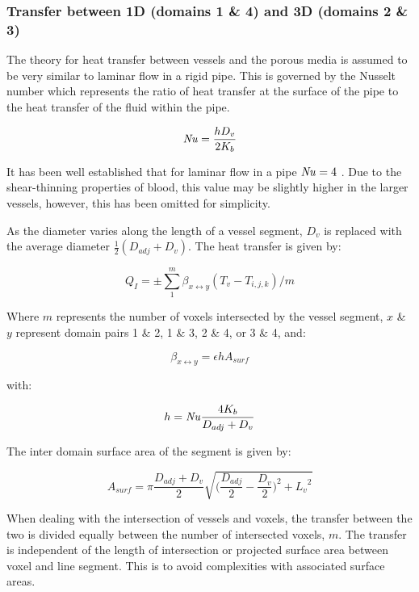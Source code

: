 \documentclass[11pt,english,a4paper,twoside,openright]{report}
\newcommand\Nuss{\mbox{\textit{Nu}}}
\begin{document}
{{{{{{{{\subsubsection{Transfer between 1D (domains 1 \& 4) and 3D (domains 2 \& 3)}

The theory for heat transfer between vessels and the porous media is assumed to be very similar to laminar flow in a rigid pipe. This is governed by the Nusselt number which represents the ratio of heat transfer at the surface of the pipe to the heat transfer of the fluid within the pipe. 

\begin{equation}  
\Nuss = \frac{hD_{v}}{2K_{b}} 
\end{equation}

It has been well established that for laminar flow in a pipe $\Nuss=4$ \cite{bergman2011fundamentals}. Due to the shear-thinning properties of blood, this value may be slightly higher in the larger vessels, however, this has been omitted for simplicity.

As the diameter varies along the length of a vessel segment, $D_{v}$ is replaced with the average diameter $\frac{1}{2}(D_{adj}+D_{v})$. The heat transfer is given by:

\begin{equation}
\label{Eq:InterDomain}
Q_{I}=\pm\sum_{1}^{m}\beta_{x\leftrightarrow y}(T_{v}-T_{i,j,k})/m
\end{equation}

Where $m$ represents the number of voxels intersected by the vessel segment, $x$ \& $y$ represent domain pairs 1 \& 2, 1 \& 3, 2 \& 4, or 3 \& 4, and: 

\begin{equation}
\beta_{x\leftrightarrow y} = \epsilon hA_{surf} 
\end{equation}

with: 

\begin{equation}  
h = \Nuss\frac{4K_{b}}{D_{adj}+D_{v}}
\end{equation}

The inter domain surface area of the segment is given by:

\begin{equation}  
A_{surf} = \pi\frac{D_{adj}+D_{v}}{2}\sqrt{\Big(\frac{D_{adj}}{2}-\frac{D_{v}}{2}\Big)^{2}+{L_{v}}^{2}}
\end{equation}

When dealing with the intersection of vessels and voxels, the transfer between the two is divided equally between the number of intersected voxels, $m$. The transfer is independent of the length of intersection or projected surface area between voxel and line segment. This is to avoid complexities with associated surface areas.

}}}}}}}}
\end{document}
